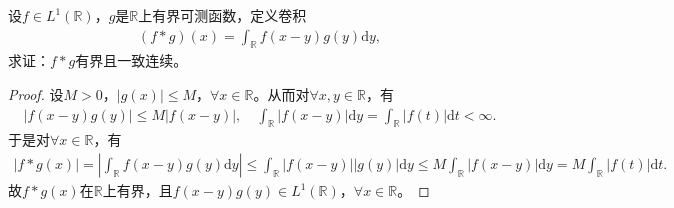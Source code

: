 \documentclass[../../main.tex]{subfiles}%
\begin{document}
\begin{example}
设$f \in L^1(\mathbb{R})$，$g$是$\mathbb{R}$上有界可测函数，定义卷积
\begin{align*}
(f * g)(x) = \int_{\mathbb{R}} f(x - y)g(y)\mathrm{d}y,
\end{align*}
求证：$f * g$有界且一致连续。
\end{example}

\begin{proof}

设$M > 0$，$|g(x)| \leqslant M$，$\forall x \in \mathbb{R}$。从而对$\forall x,y \in \mathbb{R}$，有
\begin{align*}
|f(x - y)g(y)| \leqslant M|f(x - y)|, \quad \int_{\mathbb{R}} |f(x - y)|\mathrm{d}y = \int_{\mathbb{R}} |f(t)|\mathrm{d}t < \infty.
\end{align*}
于是对$\forall x \in \mathbb{R}$，有
\begin{align*}
|f*g(x)| = \left| \int_{\mathbb{R}} f(x - y)g(y)\mathrm{d}y \right|
\leqslant \int_{\mathbb{R}} |f(x - y)||g(y)|\mathrm{d}y
\leqslant M \int_{\mathbb{R}} |f(x - y)|\mathrm{d}y
= M \int_{\mathbb{R}} |f(t)|\mathrm{d}t.
\end{align*}
故$f*g(x)$在$\mathbb{R}$上有界，且$f(x - y)g(y) \in L^1(\mathbb{R})$，$\forall x \in \mathbb{R}$。


\end{proof}
\end{document}
